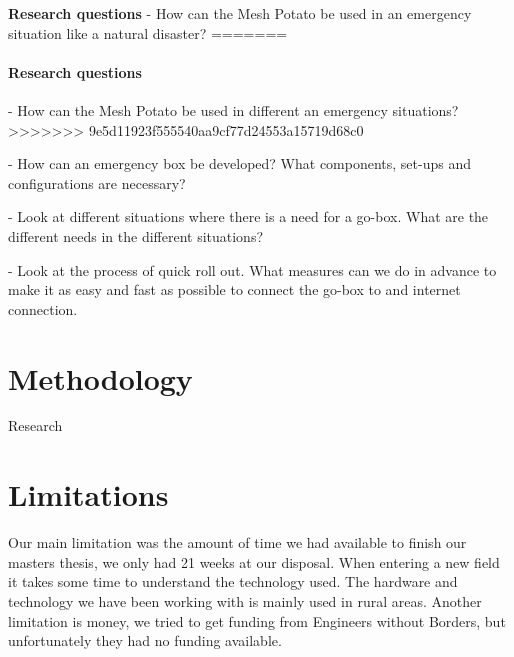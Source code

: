 \textbf{Research questions}
- How can the Mesh Potato be used in an emergency situation like a natural disaster?
=======
\paragraph{Research questions}
- How can the Mesh Potato be used in different an emergency situations?
>>>>>>> 9e5d11923f555540aa9cf77d24553a15719d68c0

- How can an emergency box be developed? What components, set-ups and configurations are necessary?
 
- Look at different situations where there is a need for a go-box. What are the different needs in the different situations?

- Look at the process of quick roll out. What measures can we do in advance to make it as easy and fast as possible to connect the go-box to and internet connection.



\section{Methodology}
Research



\section{Limitations}
Our main limitation was the amount of time we had available to finish our masters thesis, we only had 21 weeks at our disposal. When entering a new field it takes some time to understand the technology used. 
The hardware and technology we have been working with is mainly used in rural areas. Another limitation is money, we tried to get funding from Engineers without Borders, but unfortunately they had no funding available.  


